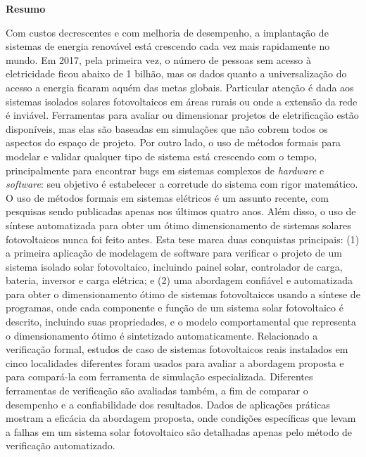 \thispagestyle{plain}
\begin{center}
%    
%    
%    
    \vspace{0.9cm}
    \textbf{Resumo}
\end{center}
Com custos decrescentes e com melhoria de desempenho, a implantação de sistemas de energia renovável está crescendo cada vez mais rapidamente no mundo. Em 2017, pela primeira vez, o número de pessoas sem acesso à eletricidade ficou abaixo de 1 bilhão, mas os dados quanto a universalização do acesso a energia ficaram aquém das metas globais. Particular atenção é dada aos sistemas isolados solares fotovoltaicos em áreas rurais ou onde a extensão da rede é inviável. 
Ferramentas para avaliar ou dimensionar projetos de eletrificação estão disponíveis, mas elas são baseadas em simulações que não cobrem todos os aspectos do espaço de projeto. Por outro lado, o uso de métodos formais para modelar e validar qualquer tipo de sistema está crescendo com o tempo, principalmente para encontrar bugs em sistemas complexos de \textit{hardware} e \textit{software}: seu objetivo é estabelecer a corretude do sistema com rigor matemático. 
O uso de métodos formais em sistemas elétricos é um assunto recente, com pesquisas sendo publicadas apenas nos últimos quatro anos. Além disso, o uso de síntese automatizada para obter um ótimo dimensionamento de sistemas solares fotovoltaicos nunca foi feito antes. 
Esta tese marca duas conquistas principais: (1) a primeira aplicação de modelagem de software para verificar o projeto de um sistema isolado solar fotovoltaico, incluindo painel solar, controlador de carga, bateria, inversor e carga elétrica; e (2) uma abordagem confiável e automatizada para obter o dimensionamento ótimo de sistemas fotovoltaicos usando a síntese de programas, onde cada componente e função de um sistema solar fotovoltaico é descrito, incluindo suas propriedades, e o modelo comportamental que representa o dimensionamento ótimo é sintetizado automaticamente. 
Relacionado a verificação formal, estudos de caso de sistemas fotovoltaicos reais instalados em cinco localidades diferentes foram usados para avaliar a abordagem proposta e para compará-la com ferramenta de simulação especializada.
Diferentes ferramentas de verificação são avaliadas também, a fim de comparar o desempenho e a confiabilidade dos resultados. Dados de aplicações práticas mostram a eficácia da abordagem proposta, onde condições específicas que levam a falhas em um sistema solar fotovoltaico são detalhadas apenas pelo método de verificação automatizado. 
